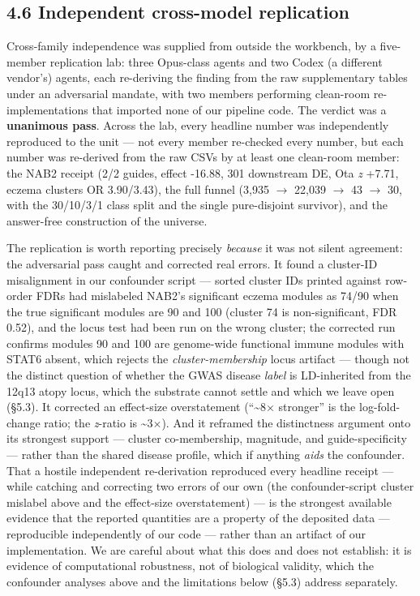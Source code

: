 \subsection*{4.6 Independent cross-model replication}\label{independent-cross-model-replication}

Cross-family independence was supplied from outside the workbench, by a five-member replication lab: three
Opus-class agents and two Codex (a different vendor's) agents, each re-deriving the finding from the raw
supplementary tables under an adversarial mandate, with two members performing clean-room re-
implementations that imported none of our pipeline code. The verdict was a \textbf{unanimous pass}. Across the
lab, every headline number was independently reproduced to the unit --- not every member re-checked every
number, but each number was re-derived from the raw CSVs by at least one clean-room member: the NAB2 receipt (2/2 guides,
effect -16.88, 301 downstream DE, Ota \emph{z} +7.71, eczema clusters OR 3.90/3.43), the full funnel
(3,935 $\rightarrow$ 22,039 $\rightarrow$ 43 $\rightarrow$ 30, with the 30/10/3/1 class split and the single pure-disjoint survivor), and the
answer-free construction of the universe.

The replication is worth reporting precisely \emph{because} it was not silent agreement: the adversarial pass
caught and corrected real errors. It found a cluster-ID misalignment in our confounder script --- sorted
cluster IDs printed against row-order FDRs had mislabeled NAB2's significant eczema modules as 74/90 when
the true significant modules are 90 and 100 (cluster 74 is non-significant, FDR 0.52), and the locus test
had been run on the wrong cluster; the corrected run confirms modules 90 and 100 are genome-wide functional
immune modules with STAT6 absent, which rejects the \emph{cluster-membership} locus artifact --- though not the
distinct question of whether the GWAS disease \emph{label} is LD-inherited from the 12q13 atopy locus, which the
substrate cannot settle and which we leave open (\S{}5.3). It corrected an effect-size overstatement (``\textasciitilde8$\times$ stronger'' is the
log-fold-change ratio; the \emph{z}-ratio is \textasciitilde3$\times$). And it reframed the distinctness argument onto its strongest
support --- cluster co-membership, magnitude, and guide-specificity --- rather than the shared disease profile,
which if anything \emph{aids} the confounder. That a hostile independent re-derivation reproduced every headline
receipt --- while catching and correcting two errors of our own (the confounder-script cluster mislabel above and
the effect-size overstatement) --- is the strongest available evidence that the reported quantities are a property of
the deposited data --- reproducible independently of our code --- rather than an artifact of our
implementation. We are careful about what this does and does not establish: it is evidence of computational
robustness, not of biological validity, which the confounder analyses above and the limitations below
(\S{}5.3) address separately.

